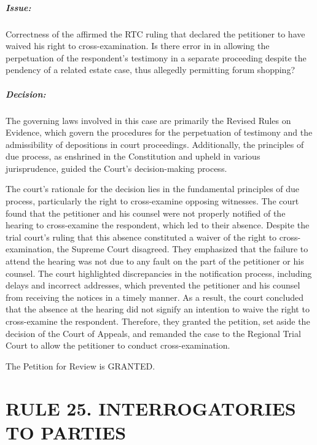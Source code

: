 \documentclass[
12pt,
oneside,
onehalfspacing,
headsepline
]{DigestCollection}
\begin{document}
\paragraph{Issue:}
\label{fe966620-09fd-11ef-932c-63c852f65e48}


Correctness of the affirmed the RTC ruling that declared the petitioner to have waived his right to cross-examination. Is there error in in allowing the perpetuation of the respondent's testimony in a separate proceeding despite the pendency of a related estate case, thus allegedly permitting forum shopping?

\paragraph{Decision:}
\label{ffdd6510-09fd-11ef-932c-63c852f65e48}


The governing laws involved in this case are primarily the Revised Rules on Evidence, which govern the procedures for the perpetuation of testimony and the admissibility of depositions in court proceedings. Additionally, the principles of due process, as enshrined in the Constitution and upheld in various jurisprudence, guided the Court's decision-making process.

The court's rationale for the decision lies in the fundamental principles of due process, particularly the right to cross-examine opposing witnesses. The court found that the petitioner and his counsel were not properly notified of the hearing to cross-examine the respondent, which led to their absence. Despite the trial court's ruling that this absence constituted a waiver of the right to cross-examination, the Supreme Court disagreed. They emphasized that the failure to attend the hearing was not due to any fault on the part of the petitioner or his counsel. The court highlighted discrepancies in the notification process, including delays and incorrect addresses, which prevented the petitioner and his counsel from receiving the notices in a timely manner. As a result, the court concluded that the absence at the hearing did not signify an intention to waive the right to cross-examine the respondent. Therefore, they granted the petition, set aside the decision of the Court of Appeals, and remanded the case to the Regional Trial Court to allow the petitioner to conduct cross-examination.

The Petition for Review is GRANTED.

\chapter{RULE 25. INTERROGATORIES TO PARTIES }
\label{02ecbb60-0a13-11ef-932c-63c852f65e48}
\end{document}
